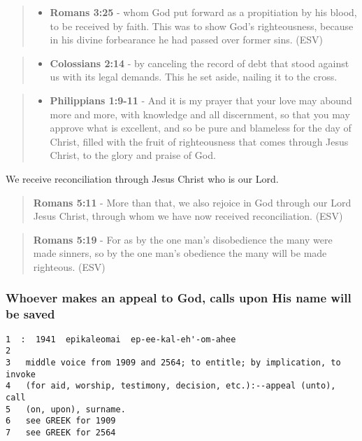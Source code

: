 \documentclass[11pt]{article}
\begin{document}
\begin{quote}
\begin{itemize}
\item \textbf{Romans 3:25} -  whom God put forward as a propitiation by his blood, to be received by faith.  This was to show God's righteousness, because in his divine forbearance he had passed over former sins.  (ESV)
\end{itemize}
\end{quote}

\begin{quote}
\begin{itemize}
\item \textbf{Colossians 2:14} - by canceling the record of debt that stood against us with its legal demands. This he set aside, nailing it to the cross.
\end{itemize}
\end{quote}

\begin{quote}
\begin{itemize}
\item \textbf{Philippians 1:9-11} - And it is my prayer that your love may abound more and more, with knowledge and all discernment, so that you may approve what is excellent, and so be pure and blameless for the day of Christ, filled with the fruit of righteousness that comes through Jesus Christ, to the glory and praise of God.
\end{itemize}
\end{quote}

We receive reconciliation through Jesus Christ who is our Lord.

\begin{quote}
\textbf{Romans 5:11} - More than that, we also rejoice in God through our Lord Jesus Christ, through whom we have now received reconciliation. (ESV)
\end{quote}

\begin{quote}
\textbf{Romans 5:19} - For as by the one man's disobedience the many were made sinners, so by the one man's obedience the many will be made righteous. (ESV)
\end{quote}

\subsubsection{Whoever makes an appeal to God, calls upon His name will be saved}
\label{sec:org114653a}
\begin{verbatim}
1  :  1941  epikaleomai  ep-ee-kal-eh'-om-ahee
2  
3   middle voice from 1909 and 2564; to entitle; by implication, to invoke
4   (for aid, worship, testimony, decision, etc.):--appeal (unto), call
5   (on, upon), surname.
6   see GREEK for 1909
7   see GREEK for 2564
\end{verbatim}
\end{document}
